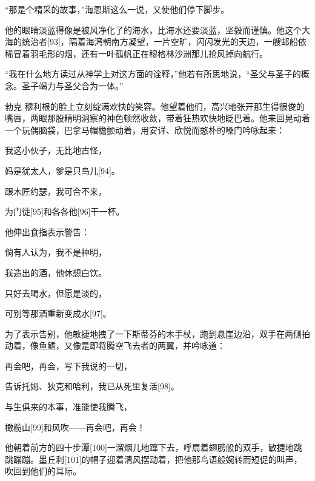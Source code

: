 \documentclass{article}
\begin{document}
“那是个精采的故事，”海恩斯这么一说，又使他们停下脚步。



他的眼睛淡蓝得像是被风净化了的海水，比海水还要淡蓝，坚毅而谨慎。他这个大海的统治者[93]，隔着海湾朝南方凝望，一片空旷，闪闪发光的天边，一艘邮船依稀冒着羽毛形的烟，还有一叶孤帆正在穆格林沙洲那儿抢风掉向航行。



“我在什么地方读过从神学上对这方面的诠释，”他若有所思地说，“圣父与圣子的概念。圣子竭力与圣父合为一体。”



勃克 \cdot 穆利根的脸上立刻绽满欢快的笑容。他望着他们，高兴地张开那生得很俊的嘴唇，两眼那股精明洞察的神色顿然收敛，带着狂热欢快地眨巴着。他来回晃动着一个玩偶脑袋，巴拿马帽檐颤动着，用安详、欣悦而憨朴的嗓门吟咏起来：



我这小伙子，无比地古怪，



妈是犹太人，爹是只鸟儿[94]。



跟木匠约瑟，我可合不来，



为门徒[95]和各各他[96]干一杯。



他伸出食指表示警告：



倘有人认为，我不是神明，



我造出的酒，他休想白饮。



只好去喝水，但愿是淡的，



可别等那酒重新变成水[97]。



为了表示告别，他敏捷地拽了一下斯蒂芬的木手杖，跑到悬崖边沿，双手在两侧拍动着，像鱼鳍，又像是即将腾空飞去者的两翼，并吟咏道：



再会吧，再会，写下我说的一切，



告诉托姆、狄克和哈利，我已从死里复活[98]。



与生俱来的本事，准能使我腾飞，



橄榄山[99]和风吹——再会吧，再会！



他朝着前方的四十步潭[100]一溜烟儿地蹿下去，呼扇着翅膀般的双手，敏捷地跳跳蹦蹦。墨丘利[101]的帽子迎着清风摆动着，把他那鸟语般婉转而短促的叫声，吹回到他们的耳际。
\end{document}
